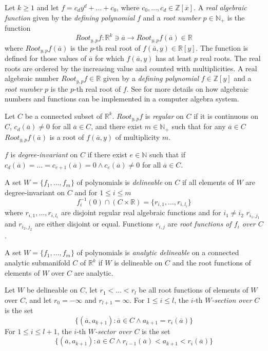 \documentclass[english]{amsart}
\numberwithin{equation}{section}
\numberwithin{figure}{section}
\begin{document}
Let $k\geq1$ and let $f=c_{d}y^{d}+\ldots+c_{0}$, where $c_{0},\ldots,c_{d}\in\mathbb{\mathbb{Z}}[\overline{x}]$.
A \emph{real algebraic function} given by the \emph{defining polynomial}
$f$ and a \emph{root number} $p\in\mathbb{N}_{+}$ is the function\begin{equation}
Root_{y,p}f:\mathbb{R}^{k}\ni\overline{a}\longrightarrow Root_{y,p}f(\overline{a})\in\mathbb{R}\label{rootfun}\end{equation}
where $Root_{y,p}f(\overline{a})$ is the $p$-th real root of $f(\overline{a},y)\in\mathbb{R}[y]$.
The function is defined for those values of $\overline{a}$ for which
$f(\overline{a},y)$ has at least $p$ real roots. The real roots
are ordered by the increasing value and counted with multiplicities.
A real algebraic number $Root_{y,p}f\in\mathbb{R}$ given by a \emph{defining
polynomial} $f\in\mathbb{Z}[y]$ and a \emph{root number} $p$ is
the $p$-th real root of $f$. See \cite{S2,S4} for more details
on how algebraic numbers and functions can be implemented in a computer
algebra system.

Let $C$ be a connected subset of $\mathbb{R}^{k}$. $Root_{y,p}f$
is\emph{ regular} on \emph{$C$} if it is continuous on $C$, $c_{d}(\overline{a})\neq0$
for all $\overline{a}\in C$, and there exist\emph{ }$m\in\mathbb{\mathbb{N}}_{+}$
such that for any $\overline{a}\in C$ $Root_{y,p}f(\overline{a})$
is a root of $f(\overline{a},y)$ of multiplicity $m$. 

$f$ is \emph{degree-invariant} on $C$ if there exist\emph{ }$e\in\mathbb{\mathbb{N}}$
such that if $c_{d}(\overline{a})=\ldots=c_{e+1}(\overline{a})=0\wedge c_{e}(\overline{a})\neq0$
for all $\overline{a}\in C$. 

A set $W=\{f_{1},\ldots,f_{m}\}$ of polynomials is \emph{delineable}
on $C$ if all elements of $W$ are degree-invariant on $C$ and for
$1\leq i\leq m$\[
f_{i}^{-1}(0)\cap(C\times\mathbb{R})=\{r_{i,1},\ldots,r_{i,l_{i}}\}\]
where $r_{i,1},\ldots,r_{i,l_{i}}$ are disjoint regular real algebraic
functions and for $i_{1}\neq i_{2}$ $r_{i_{1},j_{1}}$ and $r_{i_{2},j_{2}}$
are either disjoint or equal. Functions $r_{i,j}$ are \emph{root
functions of $f_{i}$ over $C$}.

A set $W=\{f_{1},\ldots,f_{m}\}$ of polynomials is \emph{analytic
delineable} on a connected analytic submanifold $C$ of $\mathbb{R}^{k}$
if $W$ is delineable on $C$ and the root functions of elements of
$W$ over $C$ are analytic.

Let $W$ be delineable on $C$, let $r_{1}<\ldots<r_{l}$ be all root
functions of elements of $W$ over $C$, and let $r_{0}=-\infty$
and $r_{l+1}=\infty$. For $1\leq i\leq l$, the $i$-th \emph{$W$-section
over $C$} is the set\[
\{(\overline{a},a_{k+1}):\overline{a}\in C\wedge a_{k+1}=r_{i}(\overline{a})\}\]
For $1\leq i\leq l+1$, the $i$-th \emph{$W$-sector over $C$} is
the set\[
\{(\overline{a},a_{k+1}):\overline{a}\in C\wedge r_{i-1}(\overline{a})<a_{k+1}<r_{i}(\overline{a})\}\]
\end{document}
